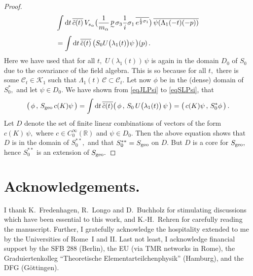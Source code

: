 \documentclass[a4paper,reqno,11pt]{amsart}
\theoremstyle{plain}
\theoremstyle{definition}
\numberwithin{equation}{section}
\newcommand{\Bb}{\mathbb{R}}
\newcommand{\calC}{{\mathcal C}}
\newcommand{\calK}{{\mathcal K}}
\renewcommand{\d}{{\rm d}}
\newcommand{\utilde}[1]{\mathop{#1}\limits_{\widetilde{\phantom{\textstyle
 #1}}}}
\renewcommand{\sec}{\alpha}
\newcommand{\Sgeoe}{S_{\rm geo}}  %
\newcommand{\msec}{{m_{\sec}}}
\newcommand{\ssec}{{s_{\sec}}}
\newcommand{\cone}{\calC}   %
\begin{document}
\begin{proof}
\begin{align}
&\int\d t\,\overline{\tilde{c}(t)}\, 
V_\ssec\big(\frac{1}{\msec}\utilde{p} 
\sigma_3\frac{1}{i}\sigma_1\,\overline{e^{\frac{t}{2}\sigma_1}}\big)\, 
 \overline{\psi(\Lambda_1(-t)(-p))}\;\\
&= \int\d t\,\overline{\tilde{c}(t)}\, 
\big(S_0U\big(\lambda_1(t)\big)\psi \,\big)(p) \,.\label{eqSLPsi}
\end{align}
Here we have used that for all $t,$ $U(\lambda_1(t))\,\psi$ is again in the 
domain $D_0$ of $S_0$ due to the covariance of the field 
algebra. This is so because for all $t,$ there is some 
$\cone_t\in\calK_1$ such that $\Lambda_1(t)\, \cone\subset \cone_t.$ 
Let now $\phi$ be in the (dense) domain of $S_0^*,$ and let $\psi\in D_0.$  
We have shown from \eqref{eqJLPsi} to \eqref{eqSLPsi}, that 
\begin{align*}
\big(\,\phi\,,\,\Sgeoe\, c(K) \psi \,\big)= 
\int\d t\,\overline{\tilde{c}(t)}
\big(\,\phi\,,\,S_0\,U\big(\lambda_1(t)\big)\,\psi \,\big) 
 = \big(\, c(K) \psi \,,\,S_0^*\phi\,\big)\,. 
\end{align*}
Let $D$ denote the set of finite linear combinations of 
vectors of the form $c(K)\,\psi,$ where $c\in C_0^\infty(\Bb)$ and
$\psi\in D_0.$ Then the above equation shows that $D$ 
is in the domain of $S_0^{**},$ %
and that $S_0^{**}=\Sgeoe$ on $D.$   
But $D$ is a core for $\Sgeoe,$ hence $S_0^{**}$ is an extension of $\Sgeoe.$ 
\end{proof}

\section*{Acknowledgements.} 
I thank K.~Fredenhagen, R.~Longo and D.~Buchholz for stimulating 
discussions which have been essential to this work, 
and K.-H.~Rehren for carefully reading the manuscript. 
Further, I gratefully acknowledge the hospitality extended to me by 
the Universities of Rome~I and II. 
Last not least, I acknowledge financial support by the SFB 288 
(Berlin), the EU (via TMR networks in Rome), the Graduiertenkolleg 
``Theoretische  Elementarteilchenphysik'' (Hamburg), and the DFG
(G\"ottingen).  
\end{document}
